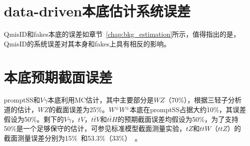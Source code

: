 \section{data-driven本底估计系统误差}
QmisID和fakes本底的误差如章节~\ref{chap:bkg_estimation}所示，值得指出的是，QmisID的系统误差对其本身和fakes上具有相反的影响。

\section{本底预期截面误差}
promptSS和$V\gamma$本底利用MC估计，其中主要部分是$WZ$（70\%），根据三轻子分析道的估计，$WZ$的截面误差为25\%。$W^{\pm}W^{\pm}$本底在promptSS占据大约10\%，其误差
假设为50\%。剩下的$V\gamma$，$tV$，$t\bar{t}V$和$t\bar{t}H$的预期截面误差均假设为50\%，为了支持50\%是一个足够保守的估计，可参见标准模型截面测量实验，$tZ$和$ttW$（$ttZ$）的
截面测量误差分别为15\%~\cite{xsection_WZ}和53.3\%（33\%）~\cite{xsection_ttV}。

